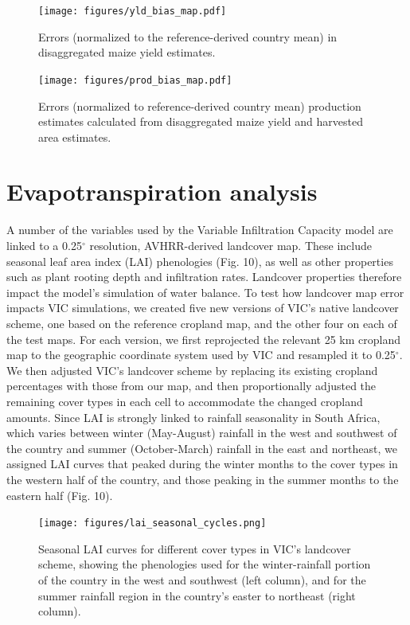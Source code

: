\documentclass[11pt, titlepage]{article}
\begin{document}
\clearpage
\begin{figure}[ht]
  \centering
     \texttt{[image: figures/yld\_bias\_map.pdf]} 
      \caption{Errors (normalized to the reference-derived country mean) in disaggregated maize yield estimates.}
      \label{fig:default}
\end{figure}

\begin{figure}[ht]
  \centering
     \texttt{[image: figures/prod\_bias\_map.pdf]} 
      \caption{Errors (normalized to reference-derived country mean) production estimates calculated from disaggregated maize yield and harvested area estimates.}
      \label{fig:default}
\end{figure}

\FloatBarrier


\section{\large Evapotranspiration analysis}
%
A number of the variables used by the Variable Infiltration Capacity \citep[VIC;][]{liang_simple_1994} model are linked to a 0.25$^{\circ}$ resolution, AVHRR-derived landcover map. These include seasonal leaf area index (LAI) phenologies (Fig. 10), as well as other properties such as plant rooting depth and infiltration rates. Landcover properties therefore impact the model's simulation of water balance. To test how landcover map error impacts VIC simulations, we created five new versions of VIC's native landcover scheme, one based on the reference cropland map, and the other four on each of the test maps. For each version, we first reprojected the relevant 25 km cropland map to the geographic coordinate system used by VIC and resampled it to 0.25$^{\circ}$. We then adjusted VIC's landcover scheme by replacing its existing cropland percentages with those from our map, and then proportionally adjusted the remaining cover types in each cell to accommodate the changed cropland amounts. Since LAI is strongly linked to rainfall seasonality in South Africa, which varies between winter (May-August) rainfall in the west and southwest of the country and summer (October-March) rainfall in the east and northeast, we assigned LAI curves that peaked during the winter months to the cover types in the western half of the country, and those peaking in the summer months to the eastern half (Fig. 10). 

\begin{figure}[!ht]
  \centering
     \texttt{[image: figures/lai\_seasonal\_cycles.png]} 
      \caption{Seasonal LAI curves for different cover types in VIC's landcover scheme, showing the phenologies used for the winter-rainfall portion of the country in the west and southwest (left column), and for the summer rainfall region in the country's easter to northeast (right column). }
      \label{fig:default}
\end{figure}
\end{document}
